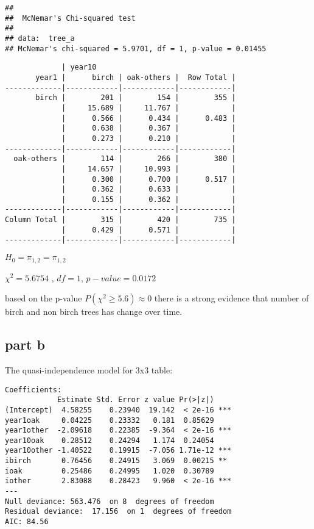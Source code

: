 \documentclass[]{article}
\begin{document}
\begin{verbatim}
## 
##  McNemar's Chi-squared test
## 
## data:  tree_a
## McNemar's chi-squared = 5.9701, df = 1, p-value = 0.01455
\end{verbatim}

\begin{verbatim}
             | year10 
       year1 |      birch | oak-others |  Row Total | 
-------------|------------|------------|------------|
       birch |        201 |        154 |        355 | 
             |     15.689 |     11.767 |            | 
             |      0.566 |      0.434 |      0.483 | 
             |      0.638 |      0.367 |            | 
             |      0.273 |      0.210 |            | 
-------------|------------|------------|------------|
  oak-others |        114 |        266 |        380 | 
             |     14.657 |     10.993 |            | 
             |      0.300 |      0.700 |      0.517 | 
             |      0.362 |      0.633 |            | 
             |      0.155 |      0.362 |            | 
-------------|------------|------------|------------|
Column Total |        315 |        420 |        735 | 
             |      0.429 |      0.571 |            | 
-------------|------------|------------|------------|
\end{verbatim}

\(H_0 = \pi_{1,2} = \pi_{1,2}\)

\(\chi^2 =5.6754\) , \(df = 1\), \(p-value=0.0172\)

based on the p-value \(P(\chi^2 \ge 5.6) \approx 0\) there is a strong
evidence that number of birch and non birch trees has change over time.

\subsection{part b}\label{part-b}

The quasi-independence model for 3x3 table:

\begin{verbatim}
Coefficients:
            Estimate Std. Error z value Pr(>|z|)    
(Intercept)  4.58255    0.23940  19.142  < 2e-16 ***
year1oak     0.04225    0.23332   0.181  0.85629    
year1other  -2.09618    0.22385  -9.364  < 2e-16 ***
year10oak    0.28512    0.24294   1.174  0.24054    
year10other -1.40522    0.19915  -7.056 1.71e-12 ***
ibirch       0.76456    0.24915   3.069  0.00215 ** 
ioak         0.25486    0.24995   1.020  0.30789    
iother       2.83088    0.28423   9.960  < 2e-16 ***
---
Null deviance: 563.476  on 8  degrees of freedom
Residual deviance:  17.156  on 1  degrees of freedom
AIC: 84.56
\end{verbatim}
\end{document}
